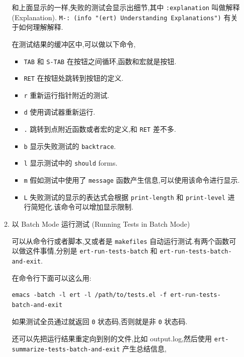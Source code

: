 \documentclass[11pt]{article}
\begin{document}
\begin{enumerate}
\begin{enumerate}
和上面显示的一样,失败的测试会显示出细节,其中 \texttt{:explanation} 叫做解释 (Explanation). \texttt{M-: (info "(ert) Understanding Explanations")} 有关于如何理解解释.

在测试结果的缓冲区中,可以做以下命令,

\begin{itemize}
\item \texttt{TAB} 和 \texttt{S-TAB} 在按钮之间循环,函数和宏就是按钮.

\item \texttt{RET} 在按钮处跳转到按钮的定义.

\item \texttt{r} 重新运行指针附近的测试.

\item \texttt{d} 使用调试器重新运行.

\item \texttt{.} 跳转到点附近函数或者宏的定义,和 \texttt{RET} 差不多.

\item \texttt{b} 显示失败测试的 \texttt{backtrace}.

\item \texttt{l} 显示测试中的 \texttt{should} forms.

\item \texttt{m} 假如测试中使用了 \texttt{message} 函数产生信息,可以使用该命令进行显示.

\item \texttt{L} 失败测试的显示的表达式会根据 \texttt{print-length} 和 \texttt{print-level} 进行简短化.该命令可以增加显示限制.
\end{itemize}


\item 以 Batch Mode 运行测试 (Running Tests in Batch Mode)
\label{sec:orgca457ad}

可以从命令行或者脚本,又或者是 \texttt{makefiles} 自动运行测试.有两个函数可以做这件事情,分别是 \texttt{ert-run-tests-batch} 和 \texttt{ert-run-tests-batch-and-exit}.

在命令行下面可以这么用:

\begin{verbatim}
emacs -batch -l ert -l /path/to/tests.el -f ert-run-tests-batch-and-exit
\end{verbatim}

如果测试全员通过就返回 \texttt{0} 状态码,否则就是非 \texttt{0} 状态码.

还可以先把运行结果重定向到别的文件,比如 output.log,然后使用 \texttt{ert-summarize-tests-batch-and-exit} 产生总结信息,


\end{enumerate}
\end{enumerate}
\end{document}
